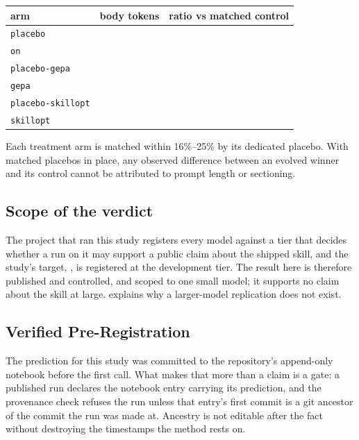 \begin{center}
\begin{tabular}{lrr}
\toprule
arm & body tokens & ratio vs matched control \\
\midrule
\texttt{placebo} & \NUM{\bodyPlaceboTokens} & \NUM{\bodyPlaceboRatio} \\
\texttt{on} & \NUM{\bodyOnTokens} & \NUM{\bodyOnRatio} \\
\texttt{placebo-gepa} & \NUM{\bodyPlaceboGepaTokens} & \NUM{\bodyPlaceboGepaRatio} \\
\texttt{gepa} & \NUM{\bodyGepaTokens} & \NUM{\bodyGepaRatioVsPlaceboGepa} \\
\texttt{placebo-skillopt} & \NUM{\bodyPlaceboSkilloptTokens} & \NUM{\bodyPlaceboSkilloptRatio} \\
\texttt{skillopt} & \NUM{\bodySkilloptTokens} & \NUM{\bodySkilloptRatioVsPlaceboSkillopt} \\
\bottomrule
\end{tabular}
\end{center}

Each treatment arm is matched within 16\%--25\% by its dedicated placebo.
With matched placebos in place, any observed difference between an evolved
winner and its control cannot be attributed to prompt length or sectioning.

\subsection{Scope of the verdict}
\label{sec:arenas}

The project that ran this study registers every model against a tier that
decides whether a run on it may support a public claim about the shipped
skill, and the study's target, \NUM{\studyModel}, is registered at the
development tier. The result here is therefore published and controlled, and
scoped to one small model; it supports no claim about the skill at large.
 explains why a larger-model replication does not
exist.

\subsection{Verified Pre-Registration}

The prediction for this study was committed to the repository's append-only
notebook before the first call. What makes that more than a claim is a gate: a
published run declares the notebook entry carrying its prediction, and the
provenance check refuses the run unless that entry's first commit is a git
ancestor of the commit the run was made at. Ancestry is not editable after the
fact without destroying the timestamps the method rests on.

